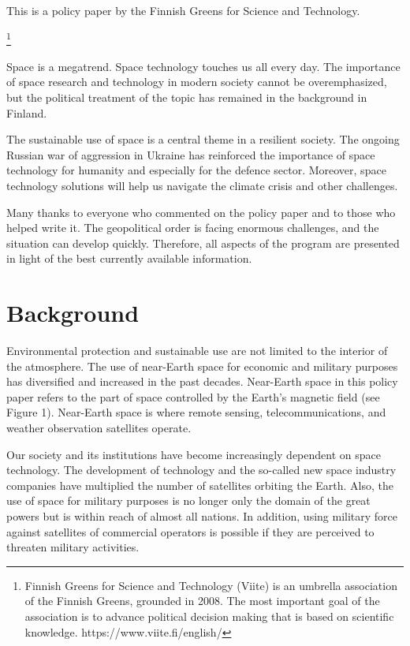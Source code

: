 \documentclass[nobib,finnish,oneside,openany,notoc,a4paper]{tufte-book}
\begin{document}
This is a policy paper by the Finnish Greens for Science and
Technology.{\footnote{Finnish Greens for Science and
  Technology (Viite) is an umbrella association of the Finnish Greens,
  grounded in 2008. The most important goal of the association is to
  advance political decision making that is based on scientific
  knowledge. https://www.viite.fi/english/}

Space is a megatrend. Space technology touches us all every day. The
importance of space research and technology in modern society cannot be
overemphasized, but the political treatment of the topic has remained in
the background in Finland.

The sustainable use of space is a central theme in a resilient society.
The ongoing Russian war of aggression in Ukraine has reinforced the
importance of space technology for humanity and especially for the
defence sector. Moreover, space technology solutions will help us
navigate the climate crisis and other challenges.

Many thanks to everyone who commented on the policy paper and to those
who helped write it. The geopolitical order is facing enormous
challenges, and the situation can develop quickly. Therefore, all
aspects of the program are presented in light of the best currently
available information.


  \chapter{Background}

Environmental protection and sustainable use are not limited to the
interior of the atmosphere. The use of near-Earth space for economic and
military purposes has diversified and increased in the past decades.
Near-Earth space in this policy paper refers to the part of space
controlled by the Earth's magnetic field (see Figure 1). Near-Earth
space is where remote sensing, telecommunications, and weather
observation satellites operate.

Our society and its institutions have become increasingly dependent on
space technology. The development of technology and the so-called new
space industry companies have multiplied the number of satellites
orbiting the Earth. Also, the use of space for military purposes is no
longer only the domain of the great powers but is within reach of almost
all nations. In addition, using military force against satellites of
commercial operators is possible if they are perceived to threaten
military activities.

}
\end{document}
